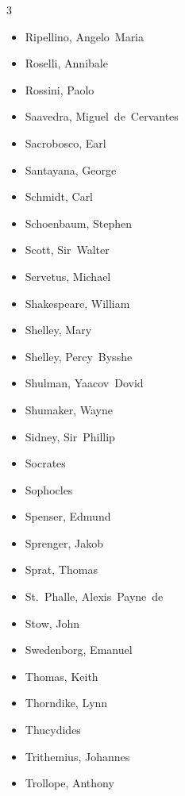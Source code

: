 \documentclass[10pt,makeidx]{extreport}
\begin{document}
\begin{multicols}{3}
\begin{itemize}
		\item Ripellino, Angelo~Maria
		\item Roselli, Annibale
		\item Rossini, Paolo
		\item Saavedra, Miguel~de~Cervantes
		\item Sacrobosco, Earl
		\item Santayana, George
		\item Schmidt, Carl
		\item Schoenbaum, Stephen
		\item Scott, Sir~Walter
		\item Servetus, Michael
		\item Shakespeare, William
		\item Shelley, Mary
		\item Shelley, Percy~Bysshe
		\item Shulman, Yaacov~Dovid
		\item Shumaker, Wayne
		\item Sidney, Sir~Phillip
		\item Socrates
		\item Sophocles
		\item Spenser, Edmund
		\item Sprenger, Jakob
		\item Sprat, Thomas
		\item St.~Phalle, Alexis~Payne~de
		\item Stow, John
		\item Swedenborg, Emanuel
		\item Thomas, Keith
		\item Thorndike, Lynn
		\item Thucydides
		\item Trithemius, Johannes
		\item Trollope, Anthony

\end{itemize}
\end{multicols}
\end{document}
